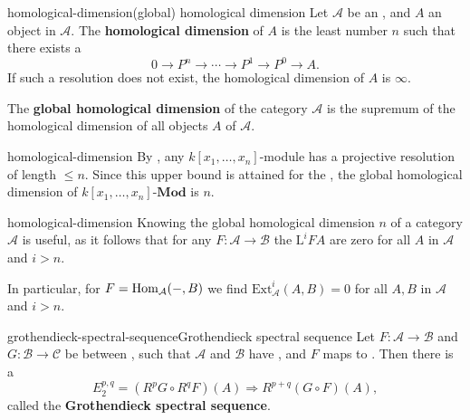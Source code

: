 \begin{topic}{homological-dimension}{(global) homological dimension}
    Let $\mathcal{A}$ be an , and $A$ an object in $\mathcal{A}$. The \textbf{homological dimension} of $A$ is the least number $n$ such that there exists a 
    \[ 0 \to P^n \to \cdots \to P^1 \to P^0 \to A . \]
    If such a resolution does not exist, the homological dimension of $A$ is $\infty$.
    
    The \textbf{global homological dimension} of the category $\mathcal{A}$ is the supremum of the homological dimension of all objects $A$ of $\mathcal{A}$.
\end{topic}

\begin{example}{homological-dimension}
    By , any $k[x_1, \ldots, x_n]$-module has a projective resolution of length $\le n$. Since this upper bound is attained for the , the global homological dimension of $k[x_1, \ldots, x_n]\text{-}\textbf{Mod}$ is $n$.
\end{example}

\begin{example}{homological-dimension}
    Knowing the global homological dimension $n$ of a category $\mathcal{A}$ is useful, as it follows that for any  $F : \mathcal{A} \to \mathcal{B}$ the  $\text{L}^i F A$ are zero for all $A$ in $\mathcal{A}$ and $i > n$.
    
    In particular, for $F = \text{Hom}_\mathcal{A}(-, B)$ we find $\text{Ext}_\mathcal{A}^i(A, B) = 0$ for all $A, B$ in $\mathcal{A}$ and $i > n$.
\end{example}

\begin{topic}{grothendieck-spectral-sequence}{Grothendieck spectral sequence}
    Let $F : \mathcal{A} \to \mathcal{B}$ and $G : \mathcal{B} \to \mathcal{C}$ be  between , such that $\mathcal{A}$ and $\mathcal{B}$ have , and $F$ maps  to . Then there is a 
    \[ E_2^{p, q} = (R^p G \circ R^q F)(A) \Rightarrow R^{p + q}(G \circ F)(A) , \]
    called the \textbf{Grothendieck spectral sequence}.
\end{topic}

